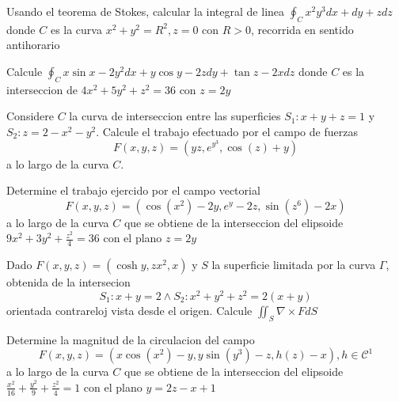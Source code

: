 \documentclass{article}
\begin{document}
\begin{problem}
Usando el teorema de Stokes, calcular la integral de linea $\oint_{C} x^{2}y^{3} dx + dy + z dz$ donde $C$ es la curva $x^{2} + y^{2} = R^{2}, z = 0$ con $R > 0$, recorrida en sentido antihorario
\end{problem}

\begin{problem}
Calcule $\oint_{C} x \sin x - 2y^{2} dx + y \cos y - 2z dy + \tan z - 2x dz$ donde $C$ es la interseccion de $4x^{2} + 5y^{2} + z^{2} = 36$ con $z = 2y$
\end{problem}

\begin{problem}
  Considere $C$ la curva de interseccion entre las superficies $S_{1}: x + y + z = 1$ y $S_{2} : z = 2 - x^{2} - y^{2}$. Calcule el trabajo efectuado por el campo de fuerzas
  \begin{equation*}
    F(x, y, z) = (yz, e^{y^{3}}, \cos(z) + y)
  \end{equation*}
  a lo largo de la curva $C$.
\end{problem}

\begin{problem}
  Determine el trabajo ejercido por el campo vectorial
  \begin{equation*}
    F(x, y, z) = (\cos(x^{2}) - 2y, e^{y} - 2z, \sin(z^{6}) - 2x)
  \end{equation*}
  a lo largo de la curva $C$ que se obtiene de la interseccion del elipsoide $9x^{2} + 3y^{2} + \frac{z^{2}}{4} = 36$ con el plano $z = 2y$
\end{problem}

\begin{problem}
  Dado $F(x, y, z) = (\cosh y, zx^{2}, x)$ y $S$ la superficie limitada por la curva $\Gamma$, obtenida de la intersecion
  \begin{equation*}
    S_{1}: x + y = 2 \land S_{2}: x^{2} + y^{2} + z^{2} = 2(x + y)
  \end{equation*}
  orientada contrareloj vista desde el origen. Calcule $\iint_{S} \nabla \times F dS$
\end{problem}

\begin{problem}
  Determine la magnitud de la circulacion del campo
  \begin{equation*}
    F(x, y, z) = (x \cos(x^{2}) - y, y \sin(y^{3}) - z, h(z) - x), h \in \mathcal{C^{1}}
  \end{equation*}
  a lo largo de la curva $C$ que se obtiene de la interseccion del elipsoide $\frac{x^{2}}{16} + \frac{y^{2}}{9} + \frac{z^{2}}{4} = 1$ con el plano $y = 2z - x + 1$
\end{problem}
\end{document}
